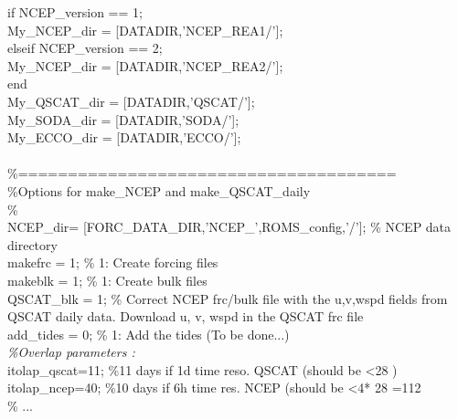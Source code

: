 \noindent if NCEP\_version  == 1;  \\
My\_NCEP\_dir  = [DATADIR,'NCEP\_REA1/'];  \\
elseif NCEP\_version  == 2;  \\
My\_NCEP\_dir  = [DATADIR,'NCEP\_REA2/'];  \\
end  \\

\noindent My\_QSCAT\_dir = [DATADIR,'QSCAT/'];  \\
My\_SODA\_dir  = [DATADIR,'SODA/'];  \\
My\_ECCO\_dir  = [DATADIR,'ECCO/'];  \\
  \\

\noindent \%======================================\\
\%Options for make\_NCEP and make\_QSCAT\_daily  \\
\%  \\
NCEP\_dir= [FORC\_DATA\_DIR,'NCEP\_',ROMS\_config,'/'];  \% NCEP data directory \\
makefrc     = 1;                      \% 1: Create forcing files \\
makeblk     = 1;                       \% 1: Create bulk files \\
QSCAT\_blk  = 1; \% Correct NCEP frc/bulk file with the u,v,wspd fields from QSCAT daily
data. Download u, v, wspd in the QSCAT frc file  \\ 

\noindent add\_tides = 0; \% 1: Add the tides (To be done...) \\


\noindent \textit{\%Overlap parameters :}  \\
itolap\_qscat=11;  \%11 days if 1d time reso. QSCAT (should be <28 ) \\
itolap\_ncep=40;   \%10 days if 6h time res.  NCEP  (should be <4* 28 =112 \\
\% ... \\

